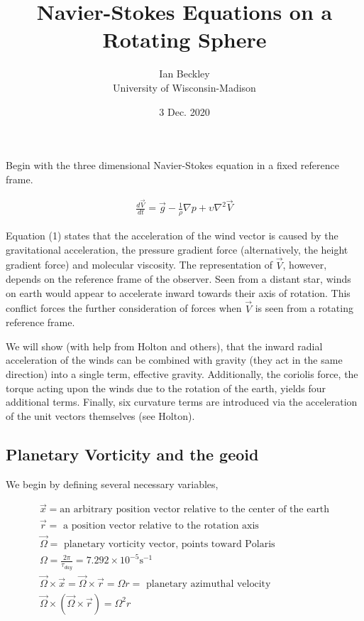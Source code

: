 \documentclass[a4paper,12pt]{article}
\begin{document}
\title{\vspace{-4.0cm}Navier-Stokes Equations on a Rotating Sphere}
\author{Ian Beckley
\\University of Wisconsin-Madison}

\date{3 Dec. 2020}

\maketitle
Begin with the three dimensional Navier-Stokes equation in a fixed reference frame.

\begin{align}
\frac{d \vec V}{dt} = \vec g - \frac{1}{\rho}\nabla p + \upsilon \nabla^2 \vec V
\end{align}

Equation (1) states that the acceleration of the wind vector is caused by the gravitational acceleration, the pressure gradient force (alternatively, the height gradient force) and molecular viscosity. The representation of $\vec V$, however, depends on the reference frame of the observer. Seen from a distant star, winds on earth would appear to accelerate inward towards their axis of rotation. This conflict forces the further consideration of forces when $\vec V$ is seen from a rotating reference frame. 

We will show (with help from Holton and others), that the inward radial acceleration of the winds can be combined with gravity (they act in the same direction) into a single term, effective gravity. Additionally, the coriolis force, the torque acting upon the winds due to the rotation of the earth, yields four additional terms. Finally, six curvature terms are introduced via the acceleration of the unit vectors themselves (see Holton).

\subsection*{Planetary Vorticity and the geoid}

We begin by defining several necessary variables,

\begin{align*}
\vec x = \text{an arbitrary position vector relative to the center of the earth}\\
\vec r = \text{ a position vector relative to the rotation axis}\\
\vec \Omega = \text{ planetary vorticity vector, points toward Polaris}\\
\Omega = \frac{2\pi}{\tau_{day}} = 7.292 \times 10^{-5} \text{s}^{-1}\\
\vec \Omega \times \vec x = \vec \Omega \times \vec r = \Omega r = \text{ planetary azimuthal velocity}\\
\vec \Omega \times (\vec \Omega \times \vec r) = \Omega^{2} r
\end{align*}
\end{document}
